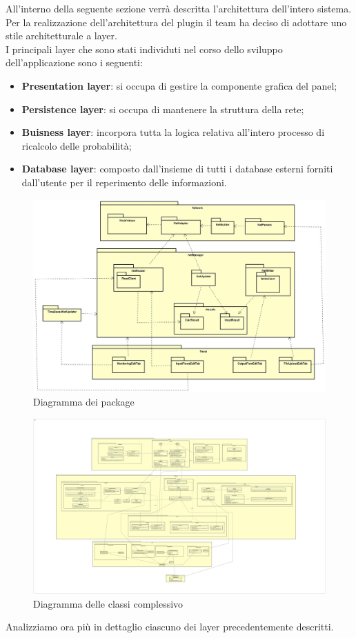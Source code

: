 \pagebreak
{}
All'interno della seguente sezione verrà descritta l'architettura dell'intero sistema.
Per la realizzazione dell'architettura del plugin il team ha deciso di adottare uno stile architetturale a layer.\\
I principali layer che sono stati individuti nel corso dello sviluppo dell'applicazione sono i seguenti:
\begin{itemize}
	\item{\textbf{Presentation layer}: si occupa di gestire la componente grafica del panel;}
	\item{\textbf{Persistence layer}: si occupa di mantenere la struttura della rete;}
	\item{\textbf{Buisness layer}: incorpora tutta la logica relativa all’intero processo di ricalcolo delle probabilità;}
	\item{\textbf{Database layer}: composto dall’insieme di tutti i database esterni forniti dall’utente per il reperimento delle informazioni.}
\end{itemize}
\begin{figure} [H]
	\centering
	\includegraphics[scale=0.25]{Img/Diagramma_Package}
	\caption{Diagramma dei package}\label{}
\end{figure}
\begin{figure} [H]
	\centering
	\includegraphics[scale=0.05]{Img/Diagramma_Classi}
	\caption{Diagramma delle classi complessivo}\label{}
\end{figure}
Analizziamo ora più in dettaglio ciascuno dei layer precedentemente descritti.
